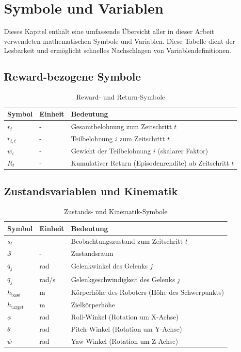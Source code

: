 ﻿\chapter{Symbole und Variablen}\label{ch:symbols}

Dieses Kapitel enthält eine umfassende Übersicht aller in dieser Arbeit verwendeten mathematischen Symbole und Variablen. Diese Tabelle dient der Lesbarkeit und ermöglicht schnelles Nachschlagen von Variablendefinitionen.

\section{Reward-bezogene Symbole}

\begin{table}[htbp]
	\centering
	\begin{tabular}{lll}
		\toprule
		\textbf{Symbol} & \textbf{Einheit} & \textbf{Bedeutung} \\
		\midrule
		$r_t$ & - & Gesamtbelohnung zum Zeitschritt $t$ \\
		$r_{i,t}$ & - & Teilbelohnung $i$ zum Zeitschritt $t$ \\
		$w_i$ & - & Gewicht der Teilbelohnung $i$ (skalarer Faktor) \\
		$R_t$ & - & Kumulativer Return (Episodenrendite) ab Zeitschritt $t$ \\
		\bottomrule
	\end{tabular}
	\caption{Reward- und Return-Symbole}
	\label{tab:symbols_reward}
\end{table}

\section{Zustandsvariablen und Kinematik}

\begin{table}[htbp]
	\centering
	\begin{tabular}{lll}
		\toprule
		\textbf{Symbol} & \textbf{Einheit} & \textbf{Bedeutung} \\
		\midrule
		$s_t$ & - & Beobachtungszustand zum Zeitschritt $t$ \\
		$\mathcal{S}$ & - & Zustandsraum \\
		$q_j$ & rad & Gelenkwinkel des Gelenks $j$ \\
		$\dot{q}_j$ & rad/s & Gelenkgeschwindigkeit des Gelenks $j$ \\
		$h_{\text{base}}$ & m & Körperhöhe des Roboters (Höhe des Schwerpunkts) \\
		$h_{\text{target}}$ & m & Zielkörperhöhe \\
		$\phi$ & rad & Roll-Winkel (Rotation um X-Achse) \\
		$\theta$ & rad & Pitch-Winkel (Rotation um Y-Achse) \\
		$\psi$ & rad & Yaw-Winkel (Rotation um Z-Achse) \\
		\bottomrule
	\end{tabular}
	\caption{Zustands- und Kinematik-Symbole}
	\label{tab:symbols_state}
\end{table}

